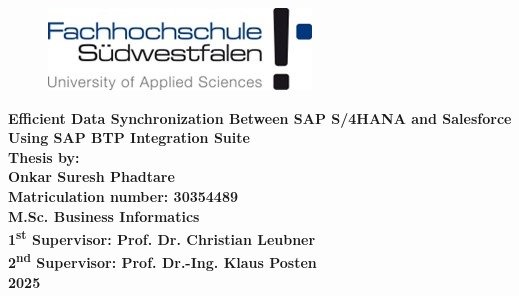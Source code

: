 \begin{titlepage}

\begin{figure}[H]
\centering
\includegraphics{Title/logo.jpg}
\caption*{}
\label{fig:entropy} 
\end{figure}

\centering
\LARGE{\textbf{ 
        Efficient Data Synchronization Between SAP S/4HANA and Salesforce Using SAP BTP Integration Suite}}\\[2.5in]



        \large{\textbf{Thesis by:}}\\[0.2cm]
        \large{\textbf{Onkar Suresh Phadtare}}\\[0.2cm]
        \large{\textbf{Matriculation number: 30354489}}\\[1.5cm]

\textbf{M.Sc. Business Informatics}\\[0.5in]

\textbf{{1\textsuperscript{st} Supervisor: Prof. Dr. Christian Leubner}}\\[0.25in]
\textbf{{2\textsuperscript{nd} Supervisor: Prof. Dr.-Ing. Klaus Posten}}\\[0.25in] 


\textbf{2025}
\newpage
\end{titlepage}